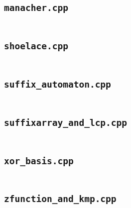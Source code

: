 \subsection*{\texttt{manacher.cpp}} \label{sec:7_7_New_file11}
\inputminted[fontsize=\footnotesize, linenos, breaklines]{cpp}{./7\ New/manacher.cpp}

\subsection*{\texttt{shoelace.cpp}} \label{sec:7_7_New_file12}
\inputminted[fontsize=\footnotesize, linenos, breaklines]{cpp}{./7\ New/shoelace.cpp}

\subsection*{\texttt{suffix\_automaton.cpp}} \label{sec:7_7_New_file13}
\inputminted[fontsize=\footnotesize, linenos, breaklines]{cpp}{./7\ New/suffix_automaton.cpp}

\subsection*{\texttt{suffixarray\_and\_lcp.cpp}} \label{sec:7_7_New_file14}
\inputminted[fontsize=\footnotesize, linenos, breaklines]{cpp}{./7\ New/suffixarray_and_lcp.cpp}

\subsection*{\texttt{xor\_basis.cpp}} \label{sec:7_7_New_file15}
\inputminted[fontsize=\footnotesize, linenos, breaklines]{cpp}{./7\ New/xor_basis.cpp}

\subsection*{\texttt{zfunction\_and\_kmp.cpp}} \label{sec:7_7_New_file16}
\inputminted[fontsize=\footnotesize, linenos, breaklines]{cpp}{./7\ New/zfunction_and_kmp.cpp}

